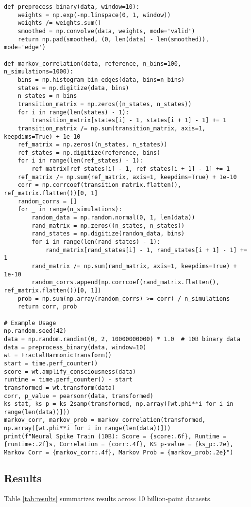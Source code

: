 \documentclass[12pt]{article}
\begin{document}
\begin{lstlisting}
def preprocess_binary(data, window=10):
    weights = np.exp(-np.linspace(0, 1, window))
    weights /= weights.sum()
    smoothed = np.convolve(data, weights, mode='valid')
    return np.pad(smoothed, (0, len(data) - len(smoothed)), mode='edge')

def markov_correlation(data, reference, n_bins=100, n_simulations=1000):
    bins = np.histogram_bin_edges(data, bins=n_bins)
    states = np.digitize(data, bins)
    n_states = n_bins
    transition_matrix = np.zeros((n_states, n_states))
    for i in range(len(states) - 1):
        transition_matrix[states[i] - 1, states[i + 1] - 1] += 1
    transition_matrix /= np.sum(transition_matrix, axis=1, keepdims=True) + 1e-10
    ref_matrix = np.zeros((n_states, n_states))
    ref_states = np.digitize(reference, bins)
    for i in range(len(ref_states) - 1):
        ref_matrix[ref_states[i] - 1, ref_states[i + 1] - 1] += 1
    ref_matrix /= np.sum(ref_matrix, axis=1, keepdims=True) + 1e-10
    corr = np.corrcoef(transition_matrix.flatten(), ref_matrix.flatten())[0, 1]
    random_corrs = []
    for _ in range(n_simulations):
        random_data = np.random.normal(0, 1, len(data))
        rand_matrix = np.zeros((n_states, n_states))
        rand_states = np.digitize(random_data, bins)
        for i in range(len(rand_states) - 1):
            rand_matrix[rand_states[i] - 1, rand_states[i + 1] - 1] += 1
        rand_matrix /= np.sum(rand_matrix, axis=1, keepdims=True) + 1e-10
        random_corrs.append(np.corrcoef(rand_matrix.flatten(), ref_matrix.flatten())[0, 1])
    prob = np.sum(np.array(random_corrs) >= corr) / n_simulations
    return corr, prob

# Example Usage
np.random.seed(42)
data = np.random.randint(0, 2, 10000000000) * 1.0  # 10B binary data
data = preprocess_binary(data, window=10)
wt = FractalHarmonicTransform()
start = time.perf_counter()
score = wt.amplify_consciousness(data)
runtime = time.perf_counter() - start
transformed = wt.transform(data)
corr, p_value = pearsonr(data, transformed)
ks_stat, ks_p = ks_2samp(transformed, np.array([wt.phi**i for i in range(len(data))]))
markov_corr, markov_prob = markov_correlation(transformed, np.array([wt.phi**i for i in range(len(data))]))
print(f"Neural Spike Train (10B): Score = {score:.6f}, Runtime = {runtime:.2f}s, Correlation = {corr:.4f}, KS p-value = {ks_p:.2e}, Markov Corr = {markov_corr:.4f}, Markov Prob = {markov_prob:.2e}")
\end{lstlisting}

\subsection{Results}
Table \ref{tab:results} summarizes results across 10 billion-point datasets.
\end{document}
